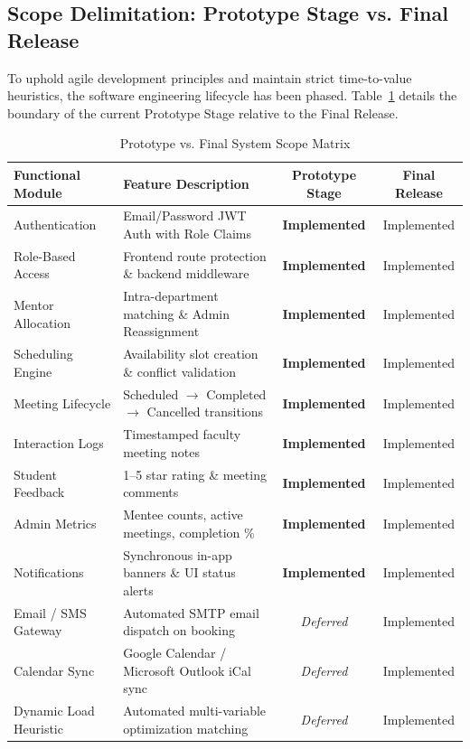 \documentclass[11pt,a4paper]{article}
\begin{document}
\subsection{Scope Delimitation: Prototype Stage vs. Final Release}
To uphold agile development principles and maintain strict time-to-value heuristics, the software engineering lifecycle has been phased. Table~\ref{tab:scope} details the boundary of the current Prototype Stage relative to the Final Release.

\begin{table}[H]
\centering
\small
\begin{tabularx}{\textwidth}{lXcc}
\toprule
\textbf{Functional Module} & \textbf{Feature Description} & \textbf{Prototype Stage} & \textbf{Final Release} \\
\midrule
Authentication & Email/Password JWT Auth with Role Claims & \textbf{Implemented} & Implemented \\
Role-Based Access & Frontend route protection \& backend middleware & \textbf{Implemented} & Implemented \\
Mentor Allocation & Intra-department matching \& Admin Reassignment & \textbf{Implemented} & Implemented \\
Scheduling Engine & Availability slot creation \& conflict validation & \textbf{Implemented} & Implemented \\
Meeting Lifecycle & Scheduled $\to$ Completed $\to$ Cancelled transitions & \textbf{Implemented} & Implemented \\
Interaction Logs & Timestamped faculty meeting notes & \textbf{Implemented} & Implemented \\
Student Feedback & 1--5 star rating \& meeting comments & \textbf{Implemented} & Implemented \\
Admin Metrics & Mentee counts, active meetings, completion \% & \textbf{Implemented} & Implemented \\
Notifications & Synchronous in-app banners \& UI status alerts & \textbf{Implemented} & Implemented \\
Email / SMS Gateway & Automated SMTP email dispatch on booking & \textit{Deferred} & Implemented \\
Calendar Sync & Google Calendar / Microsoft Outlook iCal sync & \textit{Deferred} & Implemented \\
Dynamic Load Heuristic & Automated multi-variable optimization matching & \textit{Deferred} & Implemented \\
\bottomrule
\end{tabularx}
\caption{Prototype vs. Final System Scope Matrix}
\label{tab:scope}
\end{table}
\end{document}
